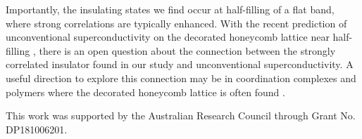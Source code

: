 \documentclass[reprint,aps,prb,amsmath,amssymb]{revtex4-2}
\begin{document}
Importantly, the insulating states we find occur at half-filling of a flat band, where strong correlations are typically enhanced. With the recent prediction of unconventional superconductivity on the decorated honeycomb lattice near half-filling \cite{Merino2021}, there is an open question about the connection between the strongly correlated insulator found in our study and unconventional superconductivity. A useful direction to explore this connection may be in coordination complexes and polymers where the decorated honeycomb lattice is often found \cite{Murase2017,Murase2017b,Kingsbury2017,Jeon2015,Darago2015,DeGayner2017,Henling2014,Henline2014,Polunin2015,Kalmutzki2018,Jiang2019,Kumar2021}.

\begin{acknowledgments}
This work was supported by the Australian Research Council through Grant No. DP181006201.
\end{acknowledgments}


\end{document}
